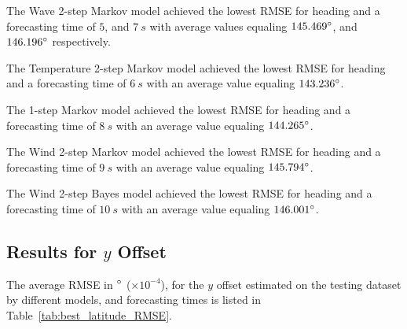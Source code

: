 \documentclass[preprint,12pt]{elsarticle}
\begin{document}
The Wave 2-step Markov model achieved the lowest RMSE for heading and a forecasting time of $5$, and $7 \ s$ with average values equaling $145.469 \degree$, and $146.196 \degree$ respectively.

The Temperature 2-step Markov model achieved the lowest RMSE for heading and a forecasting time of $6 \ s$ with an average value equaling $143.236 \degree$.

The 1-step Markov model achieved the lowest RMSE for heading and a forecasting time of $8 \ s$ with an average value equaling $144.265 \degree$.

The Wind 2-step Markov model achieved the lowest RMSE for heading and a forecasting time of $9 \ s$ with an average value equaling $145.794 \degree$.

The Wind 2-step Bayes model achieved the lowest RMSE for heading and a forecasting time of $10 \ s$ with an average value equaling $146.001 \degree$.

\subsection{Results for $y$ Offset}

The average RMSE in $\degree$ ($\times 10^{-4}$), for the $y$ offset estimated on the testing dataset by different models, and forecasting times is listed in Table~\ref{tab:best_latitude_RMSE}.
\end{document}
